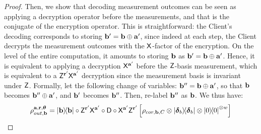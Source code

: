 \begin{proof}
    Then, we show that decoding measurement outcomes can be seen as applying a decryption operator before the measurements, and that is the conjugate of the encryption operator. This is straightforward: the Client's decoding corresponds to storing $\mathbf b'=\mathbf b\oplus \mathbf a'$, since indeed at each step, the Client decrypts the measurement outcomes with the $\mathsf{X}$-factor of the encryption. On the level of the entire computation, it amounts to storing $\mathbf b$ as $\mathbf b'=\mathbf b\oplus \mathbf a'$. Hence, it is equivalent to applying a decryption $\mathsf{X}^{\mathbf a'}$ before the $\mathsf{Z}$-basis measurement, which is equivalent to a $\mathsf{Z}^{\mathbf r'}\mathsf{X}^{\mathbf a'}$ decryption since the measurement basis is invariant under $\mathsf{Z}$. Formally, let the following change of variables: $\mathbf b'' = \mathbf b\oplus \mathbf a'$, so that $\mathbf b$ becomes $\mathbf b''\oplus \mathbf a'$, and $\mathbf b'$ becomes $\mathbf b''$. Then, re-label $\mathbf b''$ as $\mathbf b$. We thus have:
        \begin{equation}
            \rho_{out, \b}^{\a, \r, \boldsymbol{\theta}}
            =
            \ketbra\b
            \circ
            \Dec{\a'}{\r'}
            \circ
            \D
            \circ
            \Enc{\a'}{\r'}
            \left[
                \rho_{cor, \b, C}
                \otimes
            \ketbra{\boldsymbol\delta_{b}}
            \otimes
            \ketbra{0}^{\otimes w}
            \right]
        \end{equation}


\end{proof}
